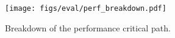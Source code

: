 \begin{figure}[htbp]
    \centering
    \texttt{[image: figs/eval/perf\_breakdown.pdf]}
    \caption{Breakdown of the performance critical path.}
    \label{fig:perf_breakdown}
\end{figure}
